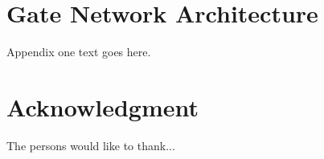 \documentclass[journal,comsoc]{IEEEtran}
\begin{document}


%


\appendices
\section{Gate Network Architecture}\label{sec:gate network architecture}
Appendix one text goes here.


\section*{Acknowledgment}


The persons would like to thank...


\ifCLASSOPTIONcaptionsoff
  \newpage
\fi
\end{document}
